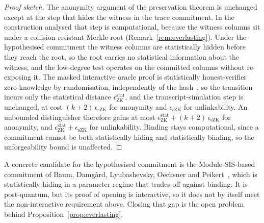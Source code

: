 \begin{proof}[Proof sketch]
    The anonymity argument of the preservation theorem is unchanged except at the step that hides the witness in the trace commitment. In the construction analysed that step is computational, because the witness columns sit under a collision-resistant Merkle root (Remark~\ref{rem:everlasting}). Under the hypothesised commitment the witness columns are statistically hidden before they reach the root, so the root carries no statistical information about the witness, and the low-degree test operates on the committed columns without re-exposing it. The masked interactive oracle proof is statistically honest-verifier zero-knowledge by randomisation, independently of the hash~\cite{cryptoeprint:2024/1037}, so the transition incurs only the statistical distance $\epsilon_{\mathrm{ZK}}^{\mathrm{stat}}$, and the transcript-simulation step is unchanged, at cost $(k+2)\,\epsilon_{\mathrm{sZK}}$ for anonymity and $\epsilon_{\mathrm{sZK}}$ for unlinkability. An unbounded distinguisher therefore gains at most $\epsilon_{\mathrm{ZK}}^{\mathrm{stat}} + (k+2)\,\epsilon_{\mathrm{sZK}}$ for anonymity, and $\epsilon_{\mathrm{ZK}}^{\mathrm{stat}} + \epsilon_{\mathrm{sZK}}$ for unlinkability. Binding stays computational, since a commitment cannot be both statistically hiding and statistically binding, so the unforgeability bound is unaffected.
\end{proof}

A concrete candidate for the hypothesised commitment is the Module-{SIS}-based commitment of Baum, Damg{\aa}rd, Lyubashevsky, Oechsner and Peikert~\cite{bdlop2018}, which is statistically hiding in a parameter regime that trades off against binding. It is post-quantum, but its proof of opening is interactive, so it does not by itself meet the non-interactive requirement above. Closing that gap is the open problem behind Proposition~\ref{prop:everlasting}.
